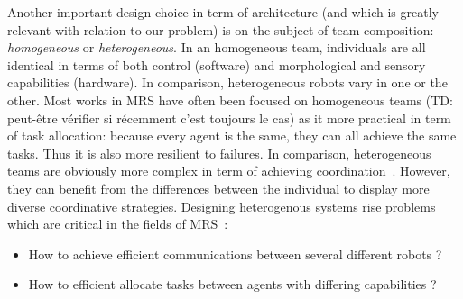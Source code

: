     Another important design choice in term of architecture (and which is greatly relevant with relation to our problem) is on the subject of team composition: \emph{homogeneous} or \emph{heterogeneous}. In an homogeneous team, individuals are all identical in terms of both control (software) and morphological and sensory capabilities (hardware). In comparison, heterogeneous robots vary in one or the other. Most works in MRS have often been focused on homogeneous teams (TD: peut-être vérifier si récemment c'est toujours le cas) as it more practical in term of task allocation: because every agent is the same, they can all achieve the same tasks. Thus it is also more resilient to failures. In comparison, heterogeneous teams are obviously more complex in term of achieving coordination~\parencite{Parker1994}. However, they can benefit from the differences between the individual to display more diverse coordinative strategies. Designing heterogenous systems rise problems which are critical in the fields of MRS~\parencite{Parker2008}:

    \begin{itemize}
      \item{How to achieve efficient communications between several different robots ?~\parencite{Jung2000}}
      \item{How to efficient allocate tasks between agents with differing capabilities ?~\parencite{Parker2003}}
    \end{itemize}


